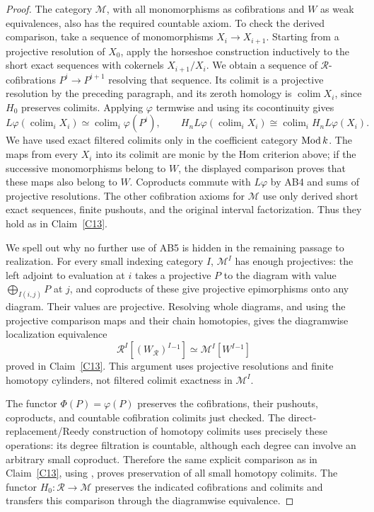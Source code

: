 \begin{proof}
The category $\mathcal M$, with all monomorphisms as cofibrations and $W$ as weak equivalences, also has the required countable axiom. To check the derived comparison, take a sequence of monomorphisms $X_i\to X_{i+1}$. Starting from a projective resolution of $X_0$, apply the horseshoe construction inductively to the short exact sequences with cokernels $X_{i+1}/X_i$. We obtain a sequence of $\mathcal R$-cofibrations $P^i\to P^{i+1}$ resolving that sequence. Its colimit is a projective resolution by the preceding paragraph, and its zeroth homology is $\operatorname{colim}X_i$, since $H_0$ preserves colimits. Applying $\varphi$ termwise and using its cocontinuity gives
\[
 L\varphi\left(\operatorname{colim}_iX_i\right)
 \simeq \operatorname{colim}_i\varphi(P^i),
 \qquad
 H_nL\varphi\left(\operatorname{colim}_iX_i\right)
 \cong\operatorname{colim}_iH_nL\varphi(X_i).
\]
We have used exact filtered colimits only in the coefficient category $\operatorname{Mod} k$. The maps from every $X_i$ into its colimit are monic by the Hom criterion above; if the successive monomorphisms belong to $W$, the displayed comparison proves that these maps also belong to $W$. Coproducts commute with $L\varphi$ by AB4 and sums of projective resolutions. The other cofibration axioms for $\mathcal M$ use only derived short exact sequences, finite pushouts, and the original interval factorization. Thus they hold as in Claim~\ref{C13}.

We spell out why no further use of AB5 is hidden in the remaining passage to realization. For every small indexing category $I$, $\mathcal M^I$ has enough projectives: the left adjoint to evaluation at $i$ takes a projective $P$ to the diagram with value $\bigoplus_{I(i,j)}P$ at $j$, and coproducts of these give projective epimorphisms onto any diagram. Their values are projective. Resolving whole diagrams, and using the projective comparison maps and their chain homotopies, gives the diagramwise localization equivalence
\[
 \mathcal R^I[(W_{\mathcal R})^I{}^{-1}]
 \simeq \mathcal M^I[W^I{}^{-1}]
\]
proved in Claim~\ref{C13}. This argument uses projective resolutions and finite homotopy cylinders, not filtered colimit exactness in $\mathcal M^I$.

The functor $\Phi(P)=\varphi(P)$ preserves the cofibrations, their pushouts, coproducts, and countable cofibration colimits just checked. The direct-replacement/Reedy construction of homotopy colimits uses precisely these operations: its degree filtration is countable, although each degree can involve an arbitrary small coproduct. Therefore the same explicit comparison as in Claim~\ref{C13}, using \citet[Proposition 9.5.7 and Theorem 9.6.3]{RadulescuBanu2009}, proves preservation of all small homotopy colimits. The functor $H_0:\mathcal R\to\mathcal M$ preserves the indicated cofibrations and colimits and transfers this comparison through the diagramwise equivalence.


\end{proof}
